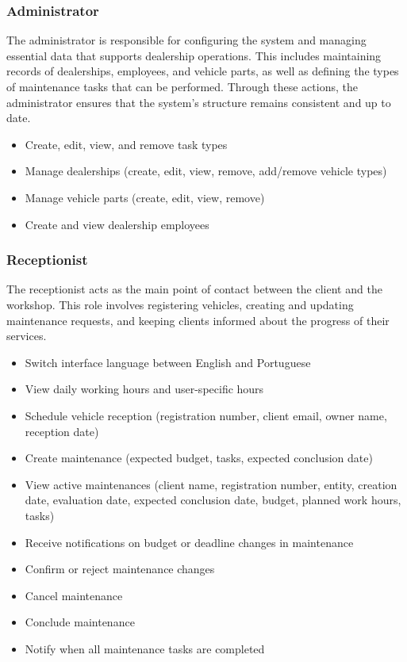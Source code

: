 \subsubsection{Administrator}

The administrator is responsible for configuring the system and managing essential data that supports dealership operations. This includes maintaining records of dealerships, employees, and vehicle parts, as well as defining the types of maintenance tasks that can be performed. Through these actions, the administrator ensures that the system's structure remains consistent and up to date.


\begin{itemize}
    \item Create, edit, view, and remove task types
    \item Manage dealerships (create, edit, view, remove, add/remove vehicle types)
    \item Manage vehicle parts (create, edit, view, remove)
    \item Create and view dealership employees
\end{itemize}

\subsubsection{Receptionist}

The receptionist acts as the main point of contact between the client and the workshop. This role involves registering vehicles, creating and updating maintenance requests, and keeping clients informed about the progress of their services. 

\begin{itemize}
    \item Switch interface language between English and Portuguese
    \item View daily working hours and user-specific hours
    \item Schedule vehicle reception (registration number, client email, owner name, reception date)
    \item Create maintenance (expected budget, tasks, expected conclusion date)
    \item View active maintenances (client name, registration number, entity, creation date, evaluation date, expected conclusion date, budget, planned work hours, tasks)
    \item Receive notifications on budget or deadline changes in maintenance
    \item Confirm or reject maintenance changes
    \item Cancel maintenance
    \item Conclude maintenance
    \item Notify when all maintenance tasks are completed
\end{itemize}

